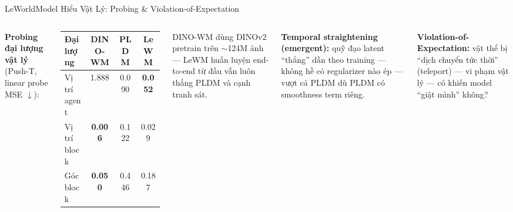 \documentclass[aspectratio=169,9pt]{beamer}
\begin{document}
\iffalse
\begin{frame}{LeWorldModel Hiểu Vật Lý: Probing \& Violation-of-Expectation}

\vspace{-0.3em}
\begin{columns}[T]

\textbf{\color{mprimary}Probing đại lượng vật lý} (Push-T, linear probe MSE $\downarrow$):

\vspace{0.25em}
{\scriptsize
\renewcommand{\arraystretch}{1.2}
\begin{tabular}{@{}l ccc@{}}
\toprule
\textbf{Đại lượng} & \textbf{DINO-WM} & \textbf{PLDM} & \textbf{LeWM} \\
\midrule
Vị trí agent  & 1.888 & 0.090 & \textbf{0.052} \\
Vị trí block  & \textbf{0.006} & 0.122 & 0.029 \\
Góc block     & \textbf{0.050} & 0.446 & 0.187 \\
\bottomrule
\end{tabular}
}

\vspace{0.3em}
{\scriptsize\color{mgray} DINO-WM dùng DINOv2 pretrain trên $\sim$124M ảnh — LeWM huấn luyện end-to-end từ đầu vẫn luôn thắng PLDM và cạnh tranh sát.}

\vspace{0.35em}
\begin{goodbox}
\scriptsize\textbf{Temporal straightening (emergent):} quỹ đạo latent ``thẳng'' dần theo training — không hề có regularizer nào ép — vượt cả PLDM dù PLDM có smoothness term riêng.
\end{goodbox}

\scriptsize\textbf{\color{mprimary}Violation-of-Expectation:} vật thể bị ``dịch chuyển tức thời'' (teleport) — vi phạm vật lý — có khiến model ``giật mình'' không?


\end{columns}
\end{frame}
\end{document}
